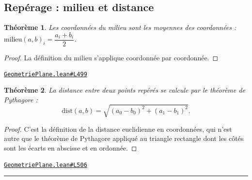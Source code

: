 \documentclass[11pt,a4paper]{article}
\theoremstyle{definition}
\theoremstyle{plain}
\newtheorem{theoreme}{Théorème}
\newcommand{\source}[2]{\par\smallskip\noindent\hfill{\footnotesize\href{#1}{\texttt{#2}}}\par\smallskip}
\begin{document}
\subsection{Repérage : milieu et distance}

\begin{theoreme}
Les coordonnées du milieu sont les moyennes des coordonnées :
$\text{milieu}(a,b)_i = \dfrac{a_i + b_i}{2}$.
\end{theoreme}

\begin{proof}
La définition du milieu s'applique coordonnée par coordonnée.
\end{proof}
\source{https://github.com/Commutator-IO/learn-lean/blob/main/cours/01-college/02-geometrie-plane/GeometriePlane.lean\#L499}{GeometriePlane.lean\#L499}

\begin{theoreme}
La distance entre deux points repérés se calcule par le théorème de Pythagore :
\[ \mathrm{dist}(a,b) = \sqrt{(a_0 - b_0)^2 + (a_1 - b_1)^2} . \]
\end{theoreme}

\begin{proof}
C'est la définition de la distance euclidienne en coordonnées, qui n'est autre que le
théorème de Pythagore appliqué au triangle rectangle dont les côtés sont les écarts en
abscisse et en ordonnée.
\end{proof}
\source{https://github.com/Commutator-IO/learn-lean/blob/main/cours/01-college/02-geometrie-plane/GeometriePlane.lean\#L506}{GeometriePlane.lean\#L506}

\vfill
\noindent\rule{0.35\linewidth}{0.4pt}\par
{}
\end{document}
